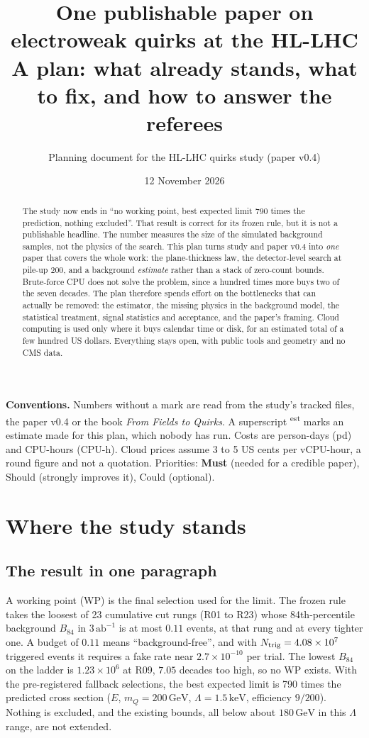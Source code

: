 \documentclass[11pt,a4paper]{article}
\title{\textbf{One publishable paper on electroweak quirks at the HL-LHC}\\[4pt]
\large A plan: what already stands, what to fix, and how to answer the referees}
\author{Planning document for the HL-LHC quirks study (paper v0.4)}
\date{12 November 2026}
\newcommand{\EST}{\textsuperscript{\textsf{est}}}
\newcommand{\keV}{\,\mathrm{keV}}
\newcommand{\GeV}{\,\mathrm{GeV}}
\newcommand{\abinv}{\,\mathrm{ab}^{-1}}
\newcommand{\Bef}{B_{84}}
\newcommand{\must}{\textsf{\textbf{Must}}}
\newcommand{\should}{\textsf{Should}}
\newcommand{\could}{\textsf{Could}}
\begin{document}
\maketitle

\begin{abstract}
\noindent
The study now ends in ``no working point, best expected limit 790 times the prediction, nothing excluded''. That result is
correct for its frozen rule, but it is not a publishable headline. The number measures the size of the simulated
background samples, not the physics of the search. This plan turns study and paper v0.4 into \emph{one} paper that covers
the whole work: the plane-thickness law, the detector-level search at pile-up 200, and a background \emph{estimate}
rather than a stack of zero-count bounds. Brute-force CPU does not solve the problem, since a hundred times more buys two
of the seven decades. The plan therefore spends effort on the bottlenecks that can actually be removed: the estimator,
the missing physics in the background model, the statistical treatment, signal statistics and acceptance, and the
paper's framing. Cloud computing is used only where it buys calendar time or disk, for an estimated total of a few
hundred US dollars. Everything stays open, with public tools and geometry and no CMS data.
\end{abstract}

\medskip
\noindent\textbf{Conventions.} Numbers without a mark are read from the study's tracked files, the paper v0.4 or the book
\emph{From Fields to Quirks}. A superscript \EST{} marks an estimate made for this plan, which nobody has run. Costs are
person-days (pd) and CPU-hours (CPU-h). Cloud prices assume 3 to 5 US cents per vCPU-hour, a round figure and not a
quotation. Priorities: \must{} (needed for a credible paper), \should{} (strongly improves it), \could{} (optional).

\tableofcontents
\newpage

\section{Where the study stands}

\subsection{The result in one paragraph}
A working point (WP) is the final selection used for the limit. The frozen rule takes the loosest of 23 cumulative cut
rungs (R01 to R23) whose 84th-percentile background $\Bef$ in $3\abinv$ is at most $0.11$ events, at that rung and at
every tighter one. A budget of $0.11$ means ``background-free'', and with $N_{\rm trig}=4.08\times10^7$ triggered events
it requires a fake rate near $2.7\times10^{-10}$ per trial. The lowest $\Bef$ on the ladder is $1.23\times10^6$ at R09,
$7.05$ decades too high, so no WP exists. With the pre-registered fallback selections, the best expected limit is 790
times the predicted cross section ($E$, $m_Q=200\GeV$, $\Lambda=1.5\keV$, efficiency $9/200$). Nothing is excluded, and the
existing bounds, all below about $180\GeV$ in this $\Lambda$ range, are not extended.
\end{document}
